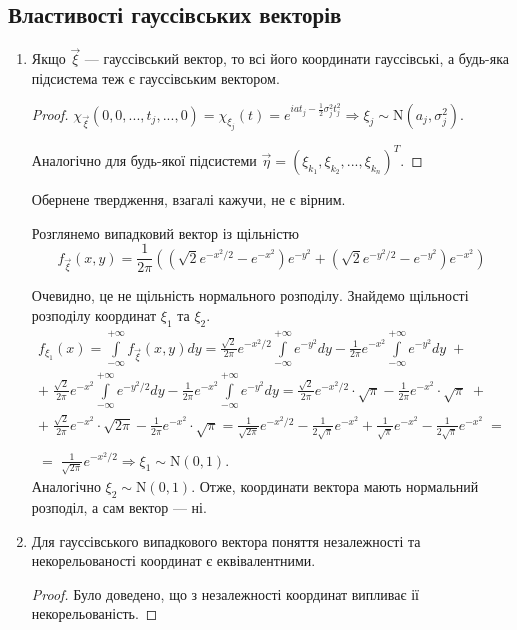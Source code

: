 \subsection{Властивості гауссівських векторів}
\begin{enumerate}
    \item Якщо $\vec{\xi}$ --- гауссівський вектор, то всі його координати гауссівські,
    а будь-яка підсистема теж є гауссівським вектором.
    \begin{proof}
        $\chi_{\vec{\xi}}(0,0,...,t_j, ..., 0) = \chi_{\xi_j}(t) = 
        e^{i a t_j - \frac{1}{2}\sigma_j^2 t_j^2} \Rightarrow \xi_j \sim \mathrm{N}(a_j, \sigma_j^2)$.

        Аналогічно для будь-якої підсистеми $\vec{\eta} = (\xi_{k_1}, \xi_{k_2}, ..., \xi_{k_n})^T$.
    \end{proof}
    \begin{remark}
        Обернене твердження, взагалі кажучи, не є вірним.

        Розглянемо випадковий вектор із щільністю
        $$ f_{\vec{\xi}}(x, y) = \frac{1}{2\pi} \left( 
            \left( \sqrt{2} e^{-x^2/2} - e^{-x^2}\right)e^{-y^2} + 
            \left( \sqrt{2} e^{-y^2/2} - e^{-y^2}\right)e^{-x^2}\right)$$

        Очевидно, це не щільність нормального розподілу. Знайдемо щільності розподілу координат $\xi_1$ та $\xi_2$.
        \begin{gather*}
            f_{\xi_1}(x) = \int\limits_{-\infty}^{+\infty}f_{\vec{\xi}}(x, y) dy =
            \frac{\sqrt{2}}{2\pi} e^{-x^2/2}\int\limits_{-\infty}^{+\infty}e^{-y^2}dy -
            \frac{1}{2\pi}e^{-x^2}\int\limits_{-\infty}^{+\infty}e^{-y^2}dy \; +\\
            + \; \frac{\sqrt{2}}{2\pi}e^{-x^2}\int\limits_{-\infty}^{+\infty} e^{-y^2/2}dy - 
            \frac{1}{2\pi} e^{-x^2}\int\limits_{-\infty}^{+\infty}e^{-y^2}dy =
            \frac{\sqrt{2}}{2\pi} e^{-x^2/2}\cdot \sqrt{\pi} - \frac{1}{2\pi}e^{-x^2} \cdot \sqrt{\pi} \; + \\
            + \; \frac{\sqrt{2}}{2\pi}e^{-x^2} \cdot \sqrt{2\pi} - \frac{1}{2\pi}e^{-x^2}\cdot \sqrt{\pi} = 
            \frac{1}{\sqrt{2\pi}}e^{-x^2/2} - \frac{1}{2\sqrt{\pi}}e^{-x^2} + \frac{1}{\sqrt{\pi}}e^{-x^2} - \frac{1}{2\sqrt{\pi}}e^{-x^2} \; = \\ 
            \\ = \; \frac{1}{\sqrt{2\pi}}e^{-x^2/2} \Rightarrow \xi_1 \sim \mathrm{N}(0, 1).
        \end{gather*}
        Аналогічно $\xi_2 \sim \mathrm{N}(0, 1)$. Отже, координати вектора мають нормальний розподіл, а сам вектор --- ні.
    \end{remark}
    \item Для гауссівського випадкового вектора поняття незалежності та некорельованості координат є еквівалентними.
    \begin{proof}
        Було доведено, що з незалежності координат випливає ії некорельованість.


\end{proof}
\end{enumerate}
